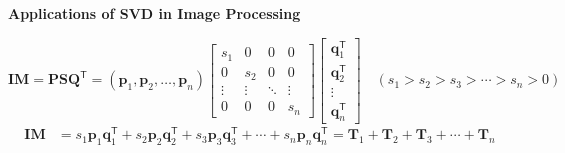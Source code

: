 \documentclass[a1paper,portrait,margin=0.8cm]{baposter}
\begin{document}
\begin{poster}
{\begin{minipage}[b]{0.65\textwidth}
\noindent \textbf{Applications of SVD in Image Processing} \\

\vspace{-4em}

\setlength{\arraycolsep}{2pt}

\[
\boldsymbol{IM}\!
= \!\boldsymbol{PSQ}^\mathsf{T} \!
= (\boldsymbol{p}_1, \boldsymbol{p}_2, \ldots, \boldsymbol{p}_n)
\!\begin{bmatrix} \!
s_1 & 0 & 0 & 0 \\ 
0 & s_2 & 0 & 0 \\[-5pt]
\vdots & \vdots & \ddots & \vdots \\
0 & 0 & 0 & s_n 
\!\!\end{bmatrix}\!\!
\!\!\begin{bmatrix}
\boldsymbol{q}_1^\mathsf{T} \\[1pt]
\boldsymbol{q}_2^\mathsf{T} \\[-5pt] 
\vdots \\ 
\boldsymbol{q}_n^\mathsf{T} \!\!
\end{bmatrix}\!\!\!\!\!\!
\quad (s_1 \!\!>\!\! s_2 \!\!>\!\! s_3 \!\!>\!\! \cdots\!\! > \!\!s_n \!\!>\!\! 0)\!
\]
\vspace{-2em}
\[
\begin{aligned}
\boldsymbol{IM} \!
&= \!{s_1 \boldsymbol{p}_1 \boldsymbol{q}_1^\mathsf{T} 
\!+ \!s_2 \boldsymbol{p}_2 \boldsymbol{q}_2^\mathsf{T} 
\!+ \!s_3 \boldsymbol{p}_3 \boldsymbol{q}_3^\mathsf{T} 
\!+ \cdots +\! s_n \boldsymbol{p}_n \boldsymbol{q}_n^\mathsf{T}}_{\text{}}
\! = \!\boldsymbol{T}_1 \!+\! \boldsymbol{T}_2\! +\! \boldsymbol{T}_3 \!+ \cdots + \!\boldsymbol{T}_n
\end{aligned}
\]
\end{minipage}



}


\end{poster}
\end{document}
